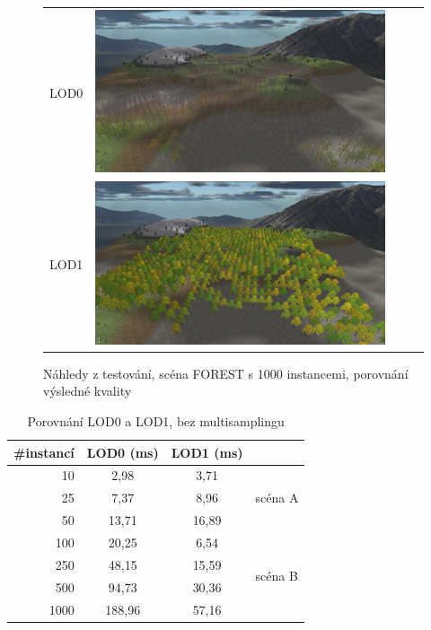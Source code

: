 \begin{figure}[here]
\begin{tabular}{r l}
LOD0 & \includegraphics[width=0.9\textwidth]{./testing/LOD0only1000.png}\\
LOD1 & \includegraphics[width=0.9\textwidth]{./testing/LOD1only1000.png}\\
\end{tabular}
\caption[Náhledy testovací scény]%
{Náhledy z testování, scéna FOREST s 1000 instancemi, porovnání výsledné kvality \label{fig:testQuality}
}
\end{figure}



\begin{table}[here]
\centering
\begin{tabular}{|r | c | c | l |} 
\hline 
\#instancí & LOD0 (ms)& LOD1 (ms)& \\ [0.5ex] 
\hline
10	&	2,98	&	3,71	& 	\multirow{3}{*}{scéna A}\\
25	&	7,37		&	8,96	&	 \\
50	&	13,71	&	16,89	&	 \\
\hline
100	& 	20,25	&	6,54	&	\multirow{4}{*}{scéna B}\\
250	& 	48,15	&	15,59	&\\
500	& 	94,73 	& 	30,36	&\\
1000 & 	188,96 	& 	57,16	&\\
 [1ex] 
\hline 
\end{tabular}
\label{table:lod01-1MS}
\caption{Porovnání LOD0 a LOD1, bez multisamplingu}

\end{table}

